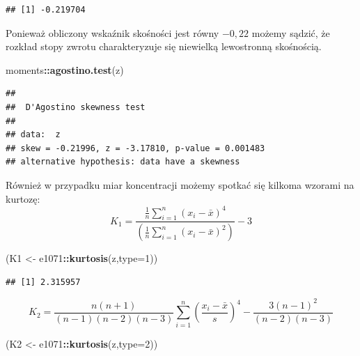 \documentclass[polish,]{book}
\newenvironment{Shaded}{\begin{snugshade}}{\end{snugshade}}
\newcommand{\DataTypeTok}[1]{\textcolor[rgb]{0.13,0.29,0.53}{#1}}
\newcommand{\DecValTok}[1]{\textcolor[rgb]{0.00,0.00,0.81}{#1}}
\newcommand{\KeywordTok}[1]{\textcolor[rgb]{0.13,0.29,0.53}{\textbf{#1}}}
\newcommand{\NormalTok}[1]{#1}
\newcommand{\OperatorTok}[1]{\textcolor[rgb]{0.81,0.36,0.00}{\textbf{#1}}}
\newcommand{\StringTok}[1]{\textcolor[rgb]{0.31,0.60,0.02}{#1}}
\begin{document}
\begin{verbatim}
## [1] -0.219704
\end{verbatim}

Ponieważ obliczony wskaźnik skośności jest równy \(-0,22\) możemy sądzić, że rozkład stopy zwrotu charakteryzuje się niewielką lewostronną skośnością.

\begin{Shaded}
\begin{Highlighting}[]
\NormalTok{moments}\OperatorTok{::}\KeywordTok{agostino.test}\NormalTok{(z)}
\end{Highlighting}
\end{Shaded}

\begin{verbatim}
## 
##  D'Agostino skewness test
## 
## data:  z
## skew = -0.21996, z = -3.17810, p-value = 0.001483
## alternative hypothesis: data have a skewness
\end{verbatim}

Również w przypadku miar koncentracji możemy spotkać się kilkoma wzorami
na kurtozę:
\begin{equation}
K_{1}=\frac{\frac{1}{n}\sum_{i=1}^{n}(x_i-\bar{x})^4}{\left(\frac{1}{n}\sum_{i=1}^{n}(x_i-\bar{x})^2\right)}-3
\label{eq:wz917}
\end{equation}

\begin{Shaded}
\begin{Highlighting}[]
\NormalTok{(K1 <-}\StringTok{ }\NormalTok{e1071}\OperatorTok{::}\KeywordTok{kurtosis}\NormalTok{(z,}\DataTypeTok{type=}\DecValTok{1}\NormalTok{))}
\end{Highlighting}
\end{Shaded}

\begin{verbatim}
## [1] 2.315957
\end{verbatim}

\begin{equation}
K_{2}=\frac{n(n+1)}{(n-1)(n-2)(n-3)}\sum_{i=1}^{n}\left(\frac{x_i-\bar{x}}{s}\right)^4-\frac{3(n-1)^2}{(n-2)(n-3)}
\label{eq:wz918}
\end{equation}

\begin{Shaded}
\begin{Highlighting}[]
\NormalTok{(K2 <-}\StringTok{ }\NormalTok{e1071}\OperatorTok{::}\KeywordTok{kurtosis}\NormalTok{(z,}\DataTypeTok{type=}\DecValTok{2}\NormalTok{))}
\end{Highlighting}
\end{Shaded}
\end{document}
